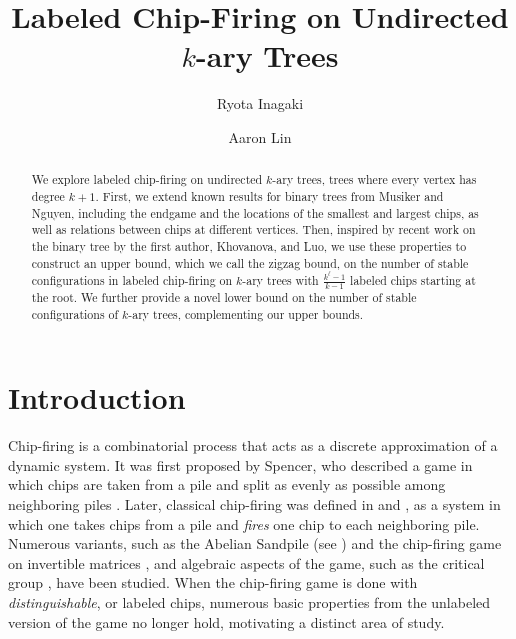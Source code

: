 \documentclass[11pt]{article}
\title{Labeled Chip-Firing on Undirected $k$-ary Trees}
\author{Ryota Inagaki \and Aaron Lin}
\date{}
\theoremstyle{remark}
\theoremstyle{definition}
\begin{document}
\maketitle

\begin{abstract}
We explore labeled chip-firing on undirected $k$-ary trees, trees where every vertex has degree $k+1$. First, we extend known results for binary trees from Musiker and Nguyen, including the endgame and the locations of the smallest and largest chips, as well as relations between chips at different vertices. Then, inspired by recent work on the binary tree by the first author, Khovanova, and Luo, we use these properties to construct an upper bound, which we call the zigzag bound, on the number of stable configurations in labeled chip-firing on $k$-ary trees with $\frac{k^{\ell}-1}{k-1}$ labeled chips starting at the root. We further provide a novel lower bound on the number of stable configurations of $k$-ary trees, complementing our upper bounds.
\end{abstract}

\renewcommand{\thefootnote}{\fnsymbol{footnote}} 



\section{Introduction}

Chip-firing is a combinatorial process that acts as a discrete approximation of a dynamic system. It was first proposed by Spencer, who described a game in which chips are taken from a pile and split as evenly as possible among neighboring piles \cite{spencer1986balancing}. Later, classical chip-firing was defined in \cite{anderson1989disks} and \cite{bjorner1991chip}, as a system in which one takes chips from a pile and \textit{fires} one chip to each neighboring pile. Numerous variants, such as the Abelian Sandpile (see \cite{bak1987self, dhar1990self,dhar1999abelian}) and the chip-firing game on invertible matrices \cite{zbMATH06585703}, and algebraic aspects of the game, such as the critical group \cite{MR3144399}, have been studied. When the chip-firing game is done with \textit{distinguishable}, or labeled chips, numerous basic properties from the unlabeled version of the game no longer hold, motivating a distinct area of study.
\end{document}
